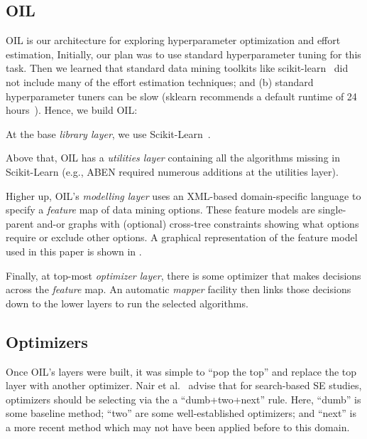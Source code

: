 \subsection{OIL}
\label{sec:5}




  OIL is  our  architecture for exploring hyperparameter optimization and effort estimation,
  Initially, our plan
was to use standard hyperparameter  tuning for this task. Then we learned that standard data mining toolkits like scikit-learn~\cite{pedregosa2011scikit} did not include many of the effort estimation techniques; and (b) standard hyperparameter tuners can be  slow     (sklearn recommends a default runtime of 24 hours~\cite{sk18}).  Hence, we build OIL:
 \bi
 \item
At the base {\em library layer}, we use     Scikit-Learn~\cite{pedregosa2011scikit}. 
\item
Above that, OIL has a {\em utilities layer} containing all the algorithms missing in Scikit-Learn (e.g., ABEN required
numerous additions at the utilities layer). 
\item
Higher up, OIL's {\em modelling layer} uses an XML-based domain-specific language to specify a {\em feature} map of data mining options.
These feature models are single-parent and-or graphs with (optional) cross-tree constraints showing what options require or exclude other options.
A graphical representation of  the feature model used in this paper is shown in .
\item
Finally, at top-most {\em optimizer layer}, there is some optimizer that  makes decisions across the {\em feature} map. An automatic {\em mapper} facility then links those decisions
down to the lower layers to run the selected algorithms.  
\ei

\subsection{Optimizers}
\label{sec:6}



Once OIL's layers were  built, it was simple  to ``pop the top'' and replace the top
layer with another optimizer.
Nair et al.~\cite{nair18}   advise that for search-based SE studies, optimizers should be selecting
via the a 
  ``dumb+two+next''  rule. Here,   ``dumb'' is some baseline method;
``two'' are some  well-established optimizers;  and ``next'' is a more recent method which may not have been
applied before to this domain.


